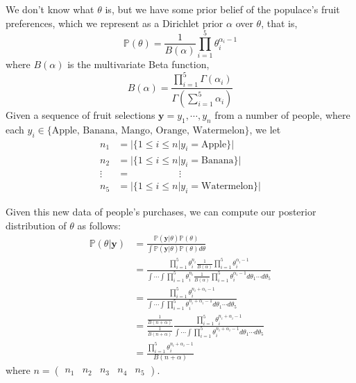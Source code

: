 We don't know what $\theta$ is, but we have some prior belief of the populace's fruit preferences, which we represent as a Dirichlet prior $\alpha$ over $\theta$, that is, 
\begin{equation*}
\mathbb{P}(\theta) = \frac{1}{B(\alpha)} \prod_{i=1}^{5} \theta_{i}^{\alpha_{i} - 1}
\end{equation*}
where $B(\alpha)$ is the multivariate Beta function, 
\begin{equation*}
B(\alpha) = \frac{\prod_{i=1}^{5} \Gamma(\alpha_{i})}{\Gamma(\sum_{i=1}^{5} \alpha_{i})}
\end{equation*}
Given a sequence of fruit selections $\mathbf{y} = y_{1}, \cdots, y_{n}$ from a number of people, where each $y_{i} \in \{\text{Apple, Banana, Mango, Orange, Watermelon}\}$, we let 
\begin{align*}
n_{1} & = |\{1 \leq i \leq n | y_{i} = \text{Apple}\}| \\
n_{2} & = |\{1 \leq i \leq n | y_{i} = \text{Banana}\}| \\
\vdots & = \; \; \; \; \; \; \; \; \; \; \; \; \; \; \; \; \; \; \vdots \\
n_{5} & = |\{1 \leq i \leq n | y_{i} = \text{Watermelon}\}|
\end{align*}

Given this new data of people's purchases, we can compute our posterior distribution of $\theta$ as follows:
\begin{align*}
\mathbb{P}(\theta | \mathbf{y}) & = \frac{\mathbb{P}(\mathbf{y} | \theta) \mathbb{P}(\theta)}{\int \mathbb{P}(\mathbf{y} | \theta) \mathbb{P}(\theta) d\theta} \\
& = \frac{\prod_{i=1}^{5} \theta_{i}^{n_{i}} \frac{1}{B(\alpha)} \prod_{i=1}^{5} \theta_{i}^{\alpha_{i}-1}}{\int \cdots \int \prod_{i=1}^{5} \theta_{i}^{n_{i}} \frac{1}{B(\alpha)} \prod_{i=1}^{5} \theta_{i}^{\alpha_{i}-1} d\theta_{1}\cdots d\theta_{5}} \\
& = \frac{\prod_{i=1}^{5} \theta_{i}^{n_{i} + \alpha_{i} - 1}}{\int \cdots \int \prod_{i=1}^{5} \theta_{i}^{n_{i} + \alpha_{i} - 1} d\theta_{1} \cdots d\theta_{5}} \\
& = \frac{\frac{1}{B(n + \alpha)}}{\frac{1}{B(n+\alpha)}} \frac{\prod_{i=1}^{5} \theta_{i}^{n_{i} + \alpha_{i} - 1}}{\int \cdots \int \prod_{i=1}^{5} \theta_{i}^{n_{i} + \alpha_{i} - 1} d\theta_{1} \cdots d\theta_{5}} \\
& = \frac{\prod_{i=1}^{5} \theta_{i}^{n_{i} + \alpha_{i} - 1}}{B(n + \alpha)}
\end{align*}
where $n = \left( \begin{array}{ccccc} n_{1} & n_{2} & n_{3} & n_{4} & n_{5} \end{array} \right)$.

